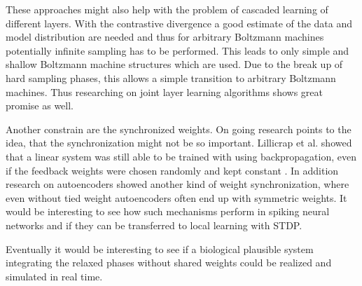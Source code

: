 These approaches might also help with the problem of cascaded learning of different layers.
With the contrastive divergence a good estimate of the data and model distribution are needed and thus for arbitrary Boltzmann machines potentially infinite sampling has to be performed.
This leads to only simple and shallow Boltzmann machine structures which are used.
Due to the break up of hard sampling phases, this allows a simple transition to arbitrary Boltzmann machines.
Thus researching on joint layer learning algorithms shows great promise as well.

Another constrain are the synchronized weights.
On going research points to the idea, that the synchronization might not be so important.
Lillicrap et al. showed that a linear system was still able to be trained with using backpropagation, even if the feedback weights were chosen randomly and kept constant \cite{Lillicrap2014}.
In addition research on autoencoders showed another kind of weight synchronization, where even without tied weight autoencoders often end up with symmetric weights\cite{vincent2010stacked}.
It would be interesting to see how such mechanisms perform in spiking neural networks and if they can be transferred to local learning with STDP.

Eventually it would be interesting to see if a biological plausible system integrating the relaxed phases without shared weights could be realized and simulated in real time.
 